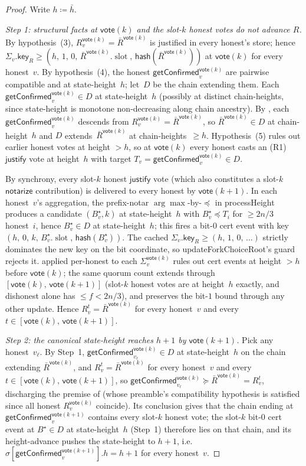 \documentclass{article}
\newcommand{\slot}[0]{\ensuremath{\operatorname{\mathrm{slot}}}}
\newcommand{\just}{\ensuremath{\mathsf{justify}}\xspace}
\newcommand{\notar}{\ensuremath{\mathsf{notarize}}\xspace}
\newcommand{\hash}{\mathsf{hash}}
\newcommand{\key}{\mathsf{key}}
\newcommand{\vote}{\mathsf{vote}}
\newcommand{\comm}[1]{\bar{#1}}
\newcommand{\processHeight}{\textsf{processHeight}\xspace}
\newcommand{\updateForkChoiceRoot}{\textsf{updateForkChoiceRoot}\xspace}
\newcommand{\getConfirmed}{\textsf{getConfirmed}\xspace}
\theoremstyle{plain}
\theoremstyle{definition}
\theoremstyle{remark}
\begin{document}
\begin{proof}
Write $h \coloneqq \comm{h}$.

\emph{Step 1: structural facts at $\vote(k)$ and the slot-$k$ honest votes do not advance $R$.}
By hypothesis~(3), $R_v^{\vote(k)} = \comm{R}^{\vote(k)}$ is justified in every honest's store; hence $\Sigma_v.\key_R \geq (h,\, 1,\, 0,\, \comm{R}^{\vote(k)}.\slot,\, \hash(\comm{R}^{\vote(k)}))$ at $\vote(k)$ for every honest~$v$.
By hypothesis~(4), the honest $\getConfirmed_v^{\vote(k)}$ are pairwise compatible and at state-height~$h$; let~$D$ be the chain extending them. Each $\getConfirmed_v^{\vote(k)} \in D$ at state-height~$h$ (possibly at distinct chain-heights, since state-height is monotone non-decreasing along chain ancestry).
By , each $\getConfirmed_v^{\vote(k)}$ descends from $R_v^{\vote(k)} = \comm{R}^{\vote(k)}$, so $\comm{R}^{\vote(k)} \in D$ at chain-height~$h$ and $D$ extends~$\comm{R}^{\vote(k)}$ at chain-heights~$\geq h$.
Hypothesis~(5) rules out earlier honest votes at height $>h$, so at $\vote(k)$ every honest casts an (R1) \just vote at height~$h$ with target $T_v = \getConfirmed_v^{\vote(k)} \in D$.

By synchrony, every slot-$k$ honest \just vote (which also constitutes a slot-$k$ \notar contribution) is delivered to every honest by $\vote(k+1)$. In each honest~$v$'s aggregation, the prefix-notar $\arg\max$-by-$\preceq$ in \processHeight{} produces a candidate $(B^\star_v, k)$ at state-height~$h$ with $B^\star_v \preceq T_i$ for $\geq 2n/3$ honest~$i$, hence $B^\star_v \in D$ at state-height~$h$; this fires a bit-$0$ cert event with key $(h,\, 0,\, k,\, B^\star_v.\slot,\, \hash(B^\star_v))$.
The cached $\Sigma_v.\key_R \geq (h,\, 1,\, 0,\, \ldots)$ strictly dominates the new key on the bit coordinate, so \updateForkChoiceRoot{}'s guard rejects it.
 applied per-honest to each $\Sigma_v^{\vote(k)}$ rules out cert events at height $>h$ before $\vote(k)$; the same quorum count extends through $[\vote(k),\, \vote(k+1)]$ (slot-$k$ honest votes are at height~$h$ exactly, and dishonest alone has $\leq f < 2n/3$), and  preserves the bit-$1$ bound through any other update.
Hence $R_v^t = \comm{R}^{\vote(k)}$ for every honest~$v$ and every $t \in [\vote(k),\, \vote(k+1)]$.

\emph{Step 2: the canonical state-height reaches $h+1$ by $\vote(k+1)$.}
Pick any honest~$v_\ell$. By Step~1, $\getConfirmed_{v_\ell}^{\vote(k)} \in D$ at state-height~$h$ on the chain extending $\comm{R}^{\vote(k)}$, and $R_v^t = \comm{R}^{\vote(k)}$ for every honest~$v$ and every $t \in [\vote(k),\, \vote(k+1)]$, so $\getConfirmed_{v_\ell}^{\vote(k)} \succeq \comm{R}^{\vote(k)} = R_v^t$, discharging the premise of  (whose preamble's compatibility hypothesis is satisfied since all honest $R_v^{\vote(k)}$ coincide).
Its conclusion gives that the chain ending at $\getConfirmed_v^{\vote(k+1)}$ contains every slot-$k$ honest vote; the slot-$k$ bit-$0$ cert event at $B^\star \in D$ at state-height~$h$ (Step~1) therefore lies on that chain, and its height-advance pushes the state-height to $h+1$, i.e.\ $\sigma[\getConfirmed_v^{\vote(k+1)}].h = h + 1$ for every honest~$v$.


\end{proof}
\end{document}
